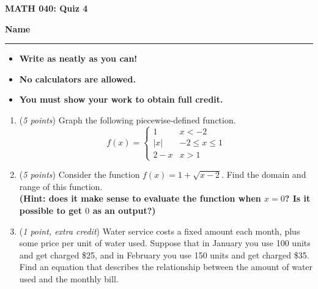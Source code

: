 \documentclass[12 pt]{article}
\begin{document}
  \begin{center}
    \textbf{\hfill MATH 040: Quiz 4} \\
  \end{center}
  \medskip

  \noindent
  \textbf{Name}\ \rule{3.5in}{.4pt} \hfill
  \vspace{.1in}
  \hspace*{0.2in}
  \begin{itemize}
    \item \textbf{Write as neatly as you can!}
    \item \textbf{No calculators are allowed.}
    \item \textbf{You must show your work to obtain full credit.}
  \end{itemize}

	\medskip
  \noindent

  \begin{enumerate}
    \item (\textit{5 points})
    Graph the following piecewise-defined function. \[
      f(x) = \begin{cases}
        1 & x < -2 \\
        |x| & -2 \leq x \leq 1 \\
        2 - x & x > 1
      \end{cases}
    \]

		\pagebreak
		\item (\textit{5 points})
    Consider the function $f(x)= 1 + \sqrt{x-2}$.
    Find the domain and range of this function.
    \\
    \textbf{(Hint: does it make sense to evaluate the function when $x=0$?
    Is it possible to get $0$ as an output?)}

    \vspace{3in}
    \item (\textit{1 point, extra credit})
    Water service costs a fixed amount each month, plus some price per unit of
    water used. Suppose that in January you use 100 units and get charged \$25,
    and in February you use 150 units and get charged \$35.
    Find an equation that describes the relationship between the amount of water
    used and the monthly bill.
  \end{enumerate}
\end{document}
